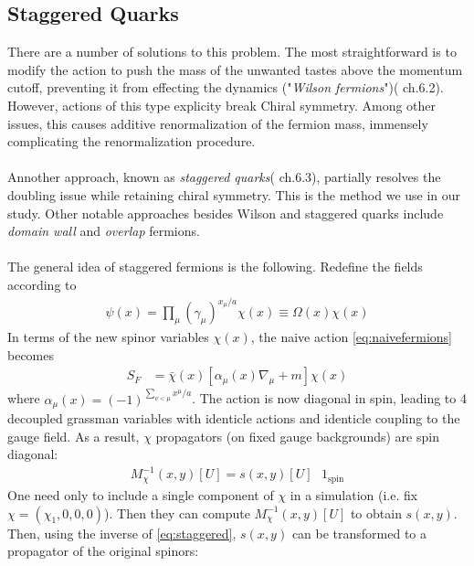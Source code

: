 \subsection{Staggered Quarks}

{}

There are a number of solutions to this problem. The most straightforward is to modify the action to push the mass of the unwanted tastes above the momentum cutoff, preventing it from effecting the dynamics ("\textit{Wilson fermions}")(\cite{DeGrand:2006zz} ch.6.2). However, actions of this type explicity break Chiral symmetry. Among other issues, this causes additive renormalization of the fermion mass, immensely complicating the renormalization procedure.
\\ \\
Annother approach, known as \textit{staggered quarks}(\cite{DeGrand:2006zz} ch.6.3), partially resolves the doubling issue while retaining chiral symmetry. This is the method we use in our study. Other notable approaches besides Wilson and staggered quarks include \textit{domain wall} \cite{Jansen:1994ym} and \textit{overlap} \cite{Narayanan:2011qj} fermions.
\\ \\
The general idea of staggered fermions is the following.
Redefine the fields according to
\begin{align}
 \psi(x) = \prod_{\mu}(\gamma_{\mu})^{x_{\mu}/a} \chi(x) \equiv \Omega(x) \chi(x)
 \label{eq:staggered}
\end{align}
In terms of the new spinor variables $\chi(x)$, the naive action \eqref{eq:naivefermions} becomes
\begin{align}
  S_F &= \bar{\chi}(x)[\alpha_{\mu}(x) \nabla_{\mu} + m ] \chi(x)
\end{align}
where $\alpha_{\mu}(x) = (-1)^{\sum_{\nu < \mu} x^{\mu}/a}$. The action is now diagonal in spin, leading to 4 decoupled grassman variables with identicle actions and identicle coupling to the gauge field. As a result, $\chi$ propagators (on fixed gauge backgrounds) are spin diagonal:
\begin{align}
	M^{-1}_{\chi}(x,y)[U] = s(x,y)[U] \text{ } 1_{\text{spin}}
\end{align}
One need only to include a single component of $\chi$ in a simulation (i.e. fix $\chi = (\chi_1,0,0,0)$). Then they can compute $M^{-1}_{\chi}(x,y)[U]$ to obtain $s(x,y)$. Then, using the inverse of \eqref{eq:staggered}, $s(x,y)$ can be transformed to a propagator of the original spinors:
